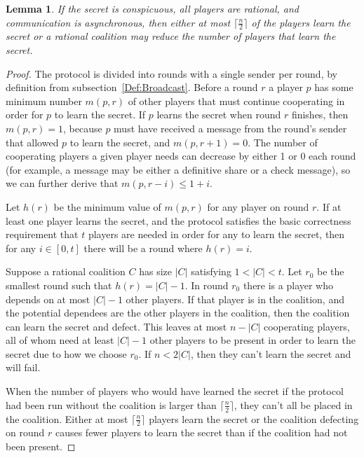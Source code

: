 \documentclass[12pt]{article}
\newtheorem{lemma}{Lemma}
\begin{document}
\begin{lemma}\label{Lem:Async:NoConspGoodRatImmune}If the secret is conspicuous, all players are rational, and communication is asynchronous, then either at most $\lceil \frac{n}{2} \rceil$ of the players learn the secret or a rational coalition may reduce the number of players that learn the secret.\end{lemma}
\begin{proof}
The protocol is divided into rounds with a single sender per round, by definition from subsection~\ref{Def:Broadcast}. Before a round $r$ a player $p$ has some minimum number $m(p, r)$ of other players that must continue cooperating in order for $p$ to learn the secret. If $p$ learns the secret when round $r$ finishes, then $m(p, r) = 1$, because $p$ must have received a message from the round's sender that allowed $p$ to learn the secret, and $m(p, r+1) = 0$. The number of cooperating players a given player needs can decrease by either 1 or 0 each round (for example, a message may be either a definitive share or a check message), so we can further derive that $m(p, r-i) \leq 1+i$.

Let $h(r)$ be the minimum value of $m(p, r)$ for any player on round $r$. If at least one player learns the secret, and the protocol satisfies the basic correctness requirement that $t$ players are needed in order for any to learn the secret, then for any $i \in [0, t]$ there will be a round where $h(r) = i$.

Suppose a rational coalition $C$ has size $|C|$ satisfying $1 < |C| < t$. Let $r_0$ be the smallest round such that $h(r) = |C|-1$. In round $r_0$ there is a player who depends on at most $|C|-1$ other players. If that player is in the coalition, and the potential dependees are the other players in the coalition, then the coalition can learn the secret and defect. This leaves at most $n-|C|$ cooperating players, all of whom need at least $|C|-1$ other players to be present in order to learn the secret due to how we choose $r_0$. If $n < 2 |C|$, then they can't learn the secret and will fail.

When the number of players who would have learned the secret if the protocol had been run without the coalition is larger than $\lceil \frac{n}{2} \rceil$, they can't all be placed in the coalition. Either at most $\lceil \frac{n}{2} \rceil$ players learn the secret or the coalition defecting on round $r$ causes fewer players to learn the secret than if the coalition had not been present.
\end{proof}
\end{document}
